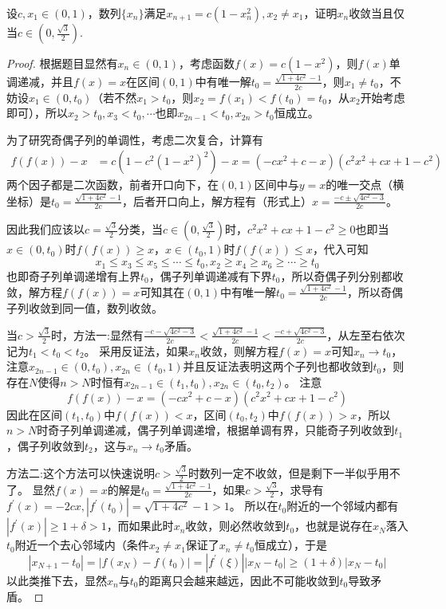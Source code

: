\documentclass[../../main.tex]{subfiles}
\begin{document}
\begin{example}
设\(c,x_1\in(0,1)\)，数列\(\{x_n\}\)满足\(x_{n + 1}=c(1 - x_n^2),x_2\neq x_1\)，证明\(x_n\)收敛当且仅当\(c\in\left(0,\frac{\sqrt{3}}{2}\right)\).
\end{example}
\begin{proof}
根据题目显然有\(x_n\in(0,1)\)，考虑函数\(f(x)=c(1 - x^2)\)，则\(f(x)\)单调递减，并且\(f(x)=x\)在区间\((0,1)\)中有唯一解\(t_0 = \frac{\sqrt{1 + 4c^2}-1}{2c}\)，则\(x_1\neq t_0\)，不妨设\(x_1\in(0,t_0)\)（若不然\(x_1 > t_0\)，则\(x_2 = f(x_1)<f(t_0)=t_0\)，从\(x_2\)开始考虑即可），所以\(x_2>t_0,x_3<t_0,\cdots\)也即\(x_{2n - 1}<t_0,x_{2n}>t_0\)恒成立。

为了研究奇偶子列的单调性，考虑二次复合，计算有
\begin{align*}
f(f(x)) - x&=c\left(1 - c^2(1 - x^2)^2\right)-x=(-cx^2 + c - x)(c^2x^2 + cx + 1 - c^2)
\end{align*}
两个因子都是二次函数，前者开口向下，在\((0,1)\)区间中与\(y = x\)的唯一交点（横坐标）是\(t_0 = \frac{\sqrt{1 + 4c^2}-1}{2c}\)，后者开口向上，解方程有（形式上）\(x=\frac{-c\pm\sqrt{4c^2 - 3}}{2c}\)。

因此我们应该以\(c = \frac{\sqrt{3}}{2}\)分类，当\(c\in\left(0,\frac{\sqrt{3}}{2}\right)\)时，\(c^2x^2 + cx + 1 - c^2\geqslant 0\)也即当\(x\in(0,t_0)\)时\(f(f(x))\geqslant  x\)，\(x\in(t_0,1)\)时\(f(f(x))\leqslant  x\)，代入可知
\[x_1\leqslant  x_3\leqslant  x_5\leqslant \cdots\leqslant  t_0,x_2\geqslant  x_4\geqslant  x_6\geqslant \cdots\geqslant  t_0\]
也即奇子列单调递增有上界\(t_0\)，偶子列单调递减有下界\(t_0\)，所以奇偶子列分别都收敛，解方程\(f(f(x)) = x\)可知其在\((0,1)\)中有唯一解\(t_0 = \frac{\sqrt{1 + 4c^2}-1}{2c}\)，所以奇偶子列收敛到同一值，数列收敛。

当\(c>\frac{\sqrt{3}}{2}\)时，{\color{blue}方法一:}显然有\(\frac{-c - \sqrt{4c^2 - 3}}{2c}<\frac{\sqrt{1 + 4c^2}-1}{2c}<\frac{-c + \sqrt{4c^2 - 3}}{2c}\)，从左至右依次记为\(t_1<t_0<t_2\)。
采用反证法，如果\(x_n\)收敛，则解方程\(f(x)=x\)可知\(x_n\rightarrow t_0\)，注意\(x_{2n - 1}\in(0,t_0),x_{2n}\in(t_0,1)\)并且反证法表明这两个子列也都收敛到\(t_0\)，则存在\(N\)使得\(n > N\)时恒有\(x_{2n - 1}\in(t_1,t_0),x_{2n}\in(t_0,t_2)\)。
注意
\[f(f(x)) - x=(-cx^2 + c - x)(c^2x^2 + cx + 1 - c^2)\]
因此在区间\((t_1,t_0)\)中\(f(f(x))<x\)，区间\((t_0,t_2)\)中\(f(f(x))>x\)，所以\(n > N\)时奇子列单调递减，偶子列单调递增，根据单调有界，只能奇子列收敛到\(t_1\)，偶子列收敛到\(t_2\)，这与\(x_n\rightarrow t_0\)矛盾。

{\color{blue}方法二:}这个方法可以快速说明\(c>\frac{\sqrt{3}}{2}\)时数列一定不收敛，但是剩下一半似乎用不了。
显然\(f(x)=x\)的解是\(t_0 = \frac{\sqrt{1 + 4c^2}-1}{2c}\)，如果\(c>\frac{\sqrt{3}}{2}\)，求导有\(f^\prime(x)=-2cx,|f^\prime(t_0)|=\sqrt{1 + 4c^2}-1>1\)。
所以在\(t_0\)附近的一个邻域内都有\(|f^\prime(x)|\geqslant 1+\delta>1\)，而如果此时\(x_n\)收敛，则必然收敛到\(t_0\)，也就是说存在\(x_N\)落入\(t_0\)附近一个去心邻域内（条件\(x_2\neq x_1\)保证了\(x_n\neq t_0\)恒成立），于是
\[|x_{N + 1}-t_0|=|f(x_N)-f(t_0)|=|f^\prime(\xi)||x_N - t_0|\geqslant (1 + \delta)|x_N - t_0|\]
以此类推下去，显然\(x_n\)与\(t_0\)的距离只会越来越远，因此不可能收敛到\(t_0\)导致矛盾。

\end{proof}
\end{document}

